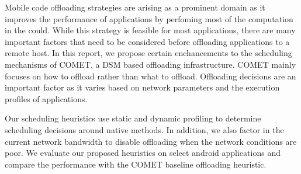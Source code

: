 Mobile code offloading strategies are arising as a prominent domain as it improves the performance of
applications by perfoming most of the computation in the could. While this strategy is feasible for most
applications, there are many important factors that need to be considered before offloading applications
to a remote host. In this report, we propose certain enchancements to the scheduling mechanisms of COMET,
a DSM based offloading infrastructure. COMET mainly focuses on how to offload rather than what to offload.
Offloading decisions are an important factor as it varies based on network parameters and the execution
profiles of applications.

Our scheduling heuristics use static and dynamic profiling to determine scheduling decisions around native
methods. In addition, we also factor in the current network bandwidth to disable offloading when the network
conditions are poor. We evaluate our proposed heuristics on select android applications and compare the
performance with the COMET baseline offloading heuristic.
